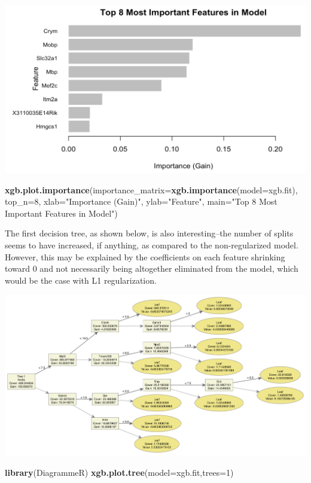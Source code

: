 \documentclass[]{article}
\newenvironment{Shaded}{\begin{snugshade}}{\end{snugshade}}
\newcommand{\DataTypeTok}[1]{\textcolor[rgb]{0.13,0.29,0.53}{#1}}
\newcommand{\DecValTok}[1]{\textcolor[rgb]{0.00,0.00,0.81}{#1}}
\newcommand{\KeywordTok}[1]{\textcolor[rgb]{0.13,0.29,0.53}{\textbf{#1}}}
\newcommand{\NormalTok}[1]{#1}
\newcommand{\StringTok}[1]{\textcolor[rgb]{0.31,0.60,0.02}{#1}}
\begin{document}
\includegraphics{Importance 2.png}

\begin{Shaded}
\begin{Highlighting}[]
\KeywordTok{xgb.plot.importance}\NormalTok{(}\DataTypeTok{importance_matrix=}\KeywordTok{xgb.importance}\NormalTok{(}\DataTypeTok{model=}\NormalTok{xgb.fit),}
                    \DataTypeTok{top_n=}\DecValTok{8}\NormalTok{,}
                    \DataTypeTok{xlab=}\StringTok{"Importance (Gain)"}\NormalTok{,}
                    \DataTypeTok{ylab=}\StringTok{"Feature"}\NormalTok{,}
                    \DataTypeTok{main=}\StringTok{"Top 8 Most Important Features in Model"}\NormalTok{)}
\end{Highlighting}
\end{Shaded}

The first decision tree, as shown below, is also interesting--the number
of splits seems to have increased, if anything, as compared to the
non-regularized model. However, this may be explained by the
coefficients on each feature shrinking toward 0 and not necessarily
being altogether eliminated from the model, which would be the case with
L1 regularization.

\includegraphics{Tree 2.png}

\begin{Shaded}
\begin{Highlighting}[]
\KeywordTok{library}\NormalTok{(DiagrammeR)}
\KeywordTok{xgb.plot.tree}\NormalTok{(}\DataTypeTok{model=}\NormalTok{xgb.fit,}\DataTypeTok{trees=}\DecValTok{1}\NormalTok{)}
\end{Highlighting}
\end{Shaded}
\end{document}

